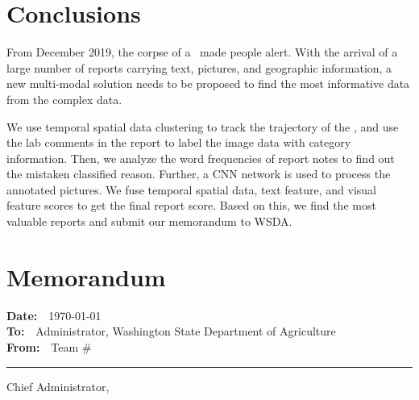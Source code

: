 \documentclass{mcmthesis}
\begin{document}
\section{Conclusions}
From December 2019, the corpse of a \VM\ made people alert. With the arrival of a large number of reports carrying text, pictures, and geographic information, a new multi-modal solution needs to be proposed to find the most informative data from the complex data.

We use temporal spatial data clustering to track the trajectory of the \VM , and use the lab comments in the report to label the image data with category information. Then, we analyze the word frequencies of report notes to find out the mistaken classified reason. Further, a CNN network is used to process the annotated pictures. We fuse temporal spatial data, text feature, and visual feature scores to get the final report score. Based on this, we find the most valuable reports and submit our memorandum to WSDA.


\section{Memorandum}

\noindent \textbf{Date:}\ \ \today \\
\noindent \textbf{To:}\ \ Administrator, Washington State Department of Agriculture \\
\noindent \textbf{From:}\ \ Team \#\TeamNumber \\
\hrule \vspace{10pt}
\noindent
Chief Administrator,
\end{document}
